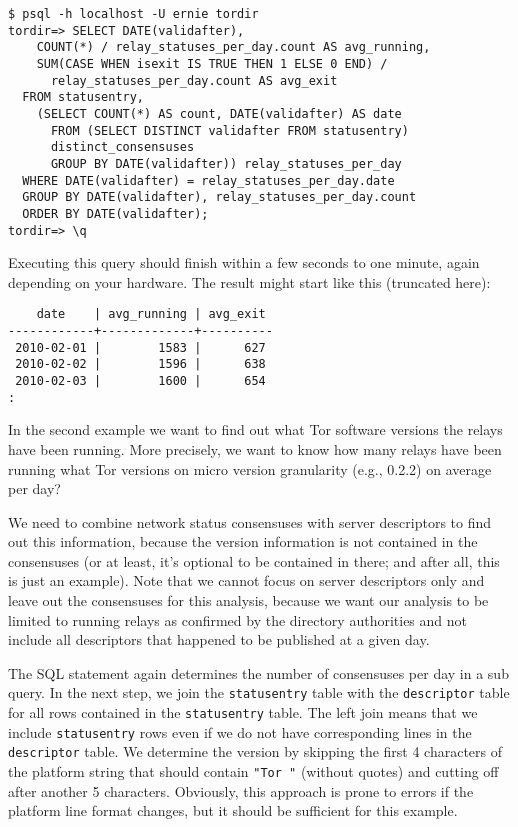\documentclass{article}
\begin{document}
\begin{verbatim}
$ psql -h localhost -U ernie tordir
tordir=> SELECT DATE(validafter),
    COUNT(*) / relay_statuses_per_day.count AS avg_running,
    SUM(CASE WHEN isexit IS TRUE THEN 1 ELSE 0 END) /
      relay_statuses_per_day.count AS avg_exit
  FROM statusentry,
    (SELECT COUNT(*) AS count, DATE(validafter) AS date
      FROM (SELECT DISTINCT validafter FROM statusentry)
      distinct_consensuses
      GROUP BY DATE(validafter)) relay_statuses_per_day
  WHERE DATE(validafter) = relay_statuses_per_day.date
  GROUP BY DATE(validafter), relay_statuses_per_day.count
  ORDER BY DATE(validafter);
tordir=> \q
\end{verbatim}

Executing this query should finish within a few seconds to one minute,
again depending on your hardware.
The result might start like this (truncated here):

\begin{verbatim}
    date    | avg_running | avg_exit
------------+-------------+----------
 2010-02-01 |        1583 |      627
 2010-02-02 |        1596 |      638
 2010-02-03 |        1600 |      654
:
\end{verbatim}

In the second example we want to find out what Tor software versions the
relays have been running.
More precisely, we want to know how many relays have been running what Tor
versions on micro version granularity (e.g., 0.2.2) on average per day?

We need to combine network status consensuses with server descriptors to
find out this information, because the version information is not
contained in the consensuses (or at least, it's optional to be contained
in there; and after all, this is just an example).
Note that we cannot focus on server descriptors only and leave out the
consensuses for this analysis, because we want our analysis to be limited
to running relays as confirmed by the directory authorities and not
include all descriptors that happened to be published at a given day.

The SQL statement again determines the number of consensuses per day in a
sub query.
In the next step, we join the \verb+statusentry+ table with the
\verb+descriptor+ table for all rows contained in the \verb+statusentry+
table.
The left join means that we include \verb+statusentry+ rows even if we do
not have corresponding lines in the \verb+descriptor+ table.
We determine the version by skipping the first 4 characters of the platform
string that should contain \verb+"Tor "+ (without quotes) and cutting off
after another 5 characters.
Obviously, this approach is prone to errors if the platform line format
changes, but it should be sufficient for this example.
\end{document}
